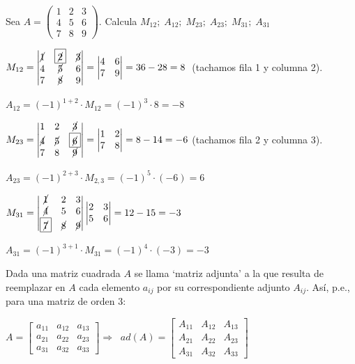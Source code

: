 \begin{ejem}
Sea $A=\left( \begin{matrix} 1&2&3\\4&5&6\\7&8&9 \end{matrix} \right)$. Calcula $M_{12};\; A_{12};\; M_{23};\; A_{23};\; M_{31};\; A_{31}$	

$M_{12}=\left| \begin{matrix} \cancel{1}& \boxed{\cancel{2}}&\cancel{3}\\4&\cancel{5}&6\\7&\cancel{8}&9 \end{matrix} \right|= 
\left| \begin{matrix} 4&6\\7&9 \end{matrix} \right|= 36-28=8\; $ \scriptsize{(tachamos fila 1 y columna 2)}\normalsize{.}

$A_{12}=(-1)^{1+2}\cdot M_{12}=(-1)^3\cdot 8=-8$

$M_{23}=\left| \begin{matrix} 1&2&\cancel{3}\\\cancel{4}&\cancel{5}&  \boxed{\cancel{6}} \\7&8&\cancel{9} \end{matrix} \right|=
  \left| \begin{matrix} 1&2\\7&8 \end{matrix} \right|=
  8-14=-6  $ \scriptsize{(tachamos fila 2 y columna 3)}\normalsize{.}
  
  $A_{23}=(-1)^{2+3}\cdot M_{2,3}=(-1)^5\cdot (-6)=6$
  
  $M_{31}=\left| \begin{matrix} \cancel{1}&2&3\\ \cancel{4}&5&6\\ \boxed{\cancel{7}} &\cancel{8}&\cancel{9} \end{matrix} \right|
   \left| \begin{matrix} 2&3\\5&6 \end{matrix} \right| = 12-15=-3  $
   
   $A_{31}=(-1)^{3+1}\cdot M_{31}=(-1)^4\cdot (-3)=-3$

\end{ejem}


\begin{defi}
Dada una matriz cuadrada $A$ se llama `matriz adjunta' a la que resulta de reemplazar en $A$ cada elemento $a_{ij}	$ por su correspondiente adjunto $A_{ij}$. Así, p.e., para una matriz de orden 3:

$A=\left[ \begin{matrix} a_{11}&a_{12}&a_{13}\\a_{21}&a_{22}&a_{23}\\a_{31}&a_{32}&a_{33} \end{matrix} \right] \Rightarrow  \; \; 
ad(A)=\left[ \begin{matrix} A_{11}&A_{12}&A_{13}\\A_{21}&A_{22}&A_{23}\\A_{31}&A_{32}&A_{33} \end{matrix} \right]$
\end{defi}

